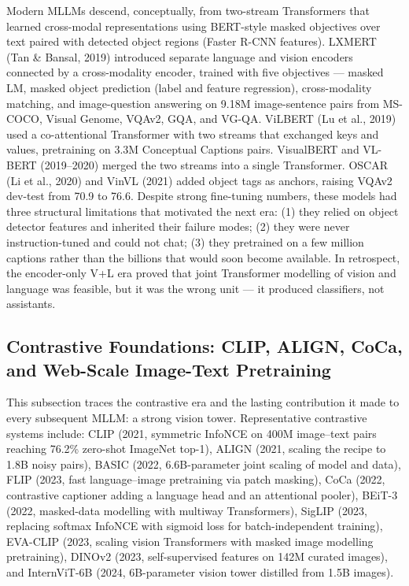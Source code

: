 Modern MLLMs descend, conceptually, from two-stream Transformers that learned cross-modal representations using BERT-style masked objectives over text paired with detected object regions (Faster R-CNN features). LXMERT (Tan \& Bansal, 2019) introduced separate language and vision encoders connected by a cross-modality encoder, trained with five objectives --- masked LM, masked object prediction (label and feature regression), cross-modality matching, and image-question answering on 9.18M image-sentence pairs from MS-COCO, Visual Genome, VQAv2, GQA, and VG-QA. ViLBERT (Lu et al., 2019) used a co-attentional Transformer with two streams that exchanged keys and values, pretraining on 3.3M Conceptual Captions pairs. VisualBERT and VL-BERT (2019--2020) merged the two streams into a single Transformer. OSCAR (Li et al., 2020) and VinVL (2021) added object tags as anchors, raising VQAv2 dev-test from 70.9 to 76.6. Despite strong fine-tuning numbers, these models had three structural limitations that motivated the next era: (1) they relied on object detector features and inherited their failure modes; (2) they were never instruction-tuned and could not chat; (3) they pretrained on a few million captions rather than the billions that would soon become available. In retrospect, the encoder-only V+L era proved that joint Transformer modelling of vision and language was feasible, but it was the wrong unit --- it produced classifiers, not assistants.

\subsection{Contrastive Foundations: CLIP, ALIGN, CoCa, and Web-Scale Image-Text Pretraining}\label{contrastive-foundations-clip-align-coca-and-web-scale-image-text-pretraining}

This subsection traces the contrastive era and the lasting contribution it made to every subsequent MLLM: a strong vision tower. Representative contrastive systems include: CLIP (2021, symmetric InfoNCE on 400M image--text pairs reaching 76.2\% zero-shot ImageNet top-1), ALIGN (2021, scaling the recipe to 1.8B noisy pairs), BASIC (2022, 6.6B-parameter joint scaling of model and data), FLIP (2023, fast language--image pretraining via patch masking), CoCa (2022, contrastive captioner adding a language head and an attentional pooler), BEiT-3 (2022, masked-data modelling with multiway Transformers), SigLIP (2023, replacing softmax InfoNCE with sigmoid loss for batch-independent training), EVA-CLIP (2023, scaling vision Transformers with masked image modelling pretraining), DINOv2 (2023, self-supervised features on 142M curated images), and InternViT-6B (2024, 6B-parameter vision tower distilled from 1.5B images).

